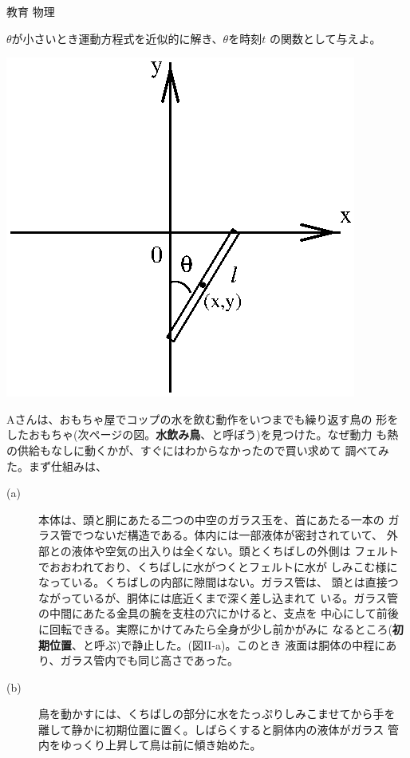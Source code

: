 \documentclass[fleqn]{jbook}
\begin{document}
\begin{question}{教育 物理}{}
\begin{subquestions}
{\begin{subsubquestions}
  \SubSubQuestion
     $\theta$が小さいとき運動方程式を近似的に解き、$\theta$を時刻$t$
     の関数として与えよ。
  \end{subsubquestions}
  }\parbox[t]{60mm}{
  \begin{center}
    \mbox{\includegraphics[clip]{1995phys-1.eps}}
  \end{center}}
%


\SubQuestion
  Aさんは、おもちゃ屋でコップの水を飲む動作をいつまでも繰り返す鳥の
  形をしたおもちゃ(次ページの図。{\bf 水飲み鳥}、と呼ぼう)を見つけた。なぜ動力
  も熱の供給もなしに動くかが、すぐにはわからなかったので買い求めて
  調べてみた。まず仕組みは、

  \begin{description}
  \item[(a)]
    本体は、頭と胴にあたる二つの中空のガラス玉を、首にあたる一本の
    ガラス管でつないだ構造である。体内には一部液体が密封されていて、
    外部との液体や空気の出入りは全くない。頭とくちばしの外側は
    フェルトでおおわれており、くちばしに水がつくとフェルトに水が
    しみこむ様になっている。くちばしの内部に隙間はない。ガラス管は、
    頭とは直接つながっているが、胴体には底近くまで深く差し込まれて
    いる。ガラス管の中間にあたる金具の腕を支柱の穴にかけると、支点を
    中心にして前後に回転できる。実際にかけてみたら全身が少し前かがみに
    なるところ({\bf 初期位置}、と呼ぶ)で静止した。(図II-a)。このとき
    液面は胴体の中程にあり、ガラス管内でも同じ高さであった。

  \item[(b)]
    鳥を動かすには、くちばしの部分に水をたっぷりしみこませてから手を
    離して静かに初期位置に置く。しばらくすると胴体内の液体がガラス
    管内をゆっくり上昇して鳥は前に傾き始めた。


\end{description}
\end{subquestions}
\end{question}
\end{document}
